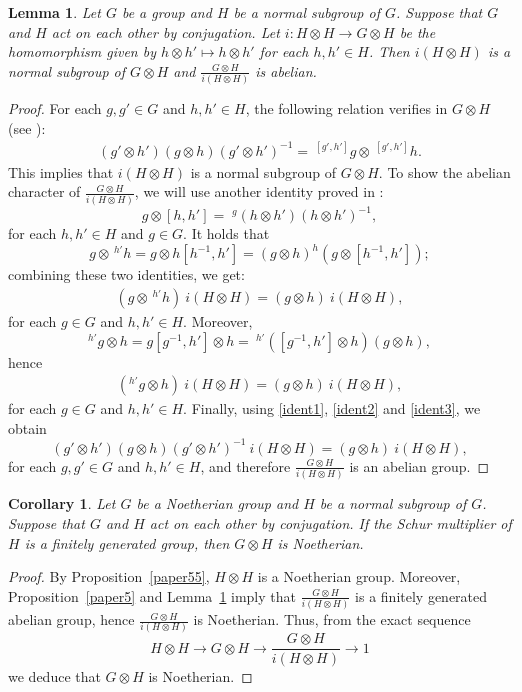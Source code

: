 \documentclass[12pt,reqno]{amsart}
\newtheorem{lemma}[subsection]{Lemma}
\newtheorem{corollary}[subsection]{Corollary}
\theoremstyle{definition}
\numberwithin{equation}{section}
\theoremstyle{definition}
\begin{document}
\begin{lemma} \label{lemma1} Let $G$ be a group and $H$ be a normal subgroup of $G$. Suppose that $G$ and $H$ act on each other by conjugation.
Let $i \colon H\otimes H \to G\otimes H$ be the homomorphism given by $h\otimes h' \mapsto h\otimes h'$ for each $h, h' \in H$.
Then $i(H\otimes H)$ is a normal subgroup of $G\otimes H$ and $\frac{G\otimes H}{i(H\otimes H)}$ is abelian.
\end{lemma}
\begin{proof}
For each $ g, g' \in G$ and $h,  h'\in H$, the following relation verifies in $G\otimes H$ (see \cite{BJR87}):
\begin{align} \label{ident1}
(g '\otimes h') (g\otimes h)(g'\otimes h')^{-1} = \: ^{[g', h']}g \otimes \: ^{[g', h']}h.
\end{align}
This implies that $i(H\otimes H)$ is a normal subgroup of $G\otimes H$. To show the abelian character of
 $\frac{G\otimes H}{i(H\otimes H)}$, we will use another identity proved in \cite{BJR87}:
\[
g\otimes [h, h'] =\; ^{g} (h\otimes h') (h\otimes h') ^{-1},
\]
for each $h, h'\in H$ and $g\in G$. It holds that
\[
g\otimes \, ^{h'} h = g\otimes  h [h^{-1}, h'] = ( g\otimes  h )^h( g\otimes  [h^{-1}, h']);
\]
combining these two identities, we get:
\begin{align} \label{ident2}
(g\otimes \,^{h'} h) \:  i(H\otimes H) =(g\otimes  h) \: i(H\otimes H) ,
\end{align}
for each $g\in G$ and $h, h'\in H$. Moreover,
\[
^{h'}g\otimes  h = g[g^{-1}, h']\otimes  h = \: ^{h'}([g^{-1}, h']\otimes  h)(g\otimes  h),
\]
hence
\begin{align} \label{ident3}
(^{h'}g\otimes  h) \:  i(H\otimes H) =(g\otimes  h) \: i(H\otimes H) ,
\end{align}
for each $g\in G$ and $h, h'\in H$. Finally, using \eqref{ident1}, \eqref{ident2} and \eqref{ident3}, we obtain
\[
(g'\otimes h')(g\otimes h)(g'\otimes h')^{-1} \: i(H\otimes H) =(g\otimes h)  \: i(H\otimes H) ,
\]
for each $g, g'\in G$ and $h, h'\in H$, and therefore $\frac{G\otimes H}{i(H\otimes H)}$ is an abelian group.
\end{proof}

\begin{corollary} \label{corollary1}  Let $G$ be a Noetherian group and $H$ be a normal subgroup of $G$. Suppose that
$G$ and $H$ act on each other by conjugation. If the Schur multiplier of $H$ is a finitely generated group, then $G\otimes H$
is Noetherian.
\end{corollary}
\begin{proof}  By Proposition~\ref{paper55}, $H\otimes H$ is a Noetherian group. Moreover, Proposition~\ref{paper5}
and Lemma~\ref{lemma1} imply that $\frac{G\otimes H}{i(H\otimes H)}$ is a finitely generated abelian group,
hence $\frac{G\otimes H}{i(H\otimes H)}$ is Noetherian. Thus, from the exact sequence
\[
H\otimes H \to G\otimes H \to \frac{G\otimes H}{i(H\otimes H)} \to 1
\]
we deduce that $G\otimes H$ is Noetherian.
\end{proof}
\end{document}
